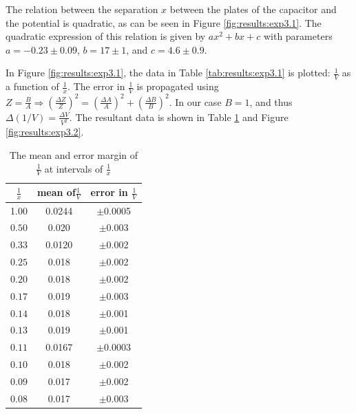 The relation between the separation $x$ between the plates of the capacitor and the potential is quadratic, as can be seen in Figure \ref{fig:results:exp3.1}. The quadratic expression of this relation is given by $ax^2+bx+c$ with parameters $a= -0.23 \pm 0.09$, $b= 17 \pm1 $, and $c=4.6 \pm 0.9$. 

In Figure \ref{fig:results:exp3.1}, the data in Table \ref{tab:results:exp3.1} is plotted: $\frac{1}{V}$ as a function of $\frac{1}{x}$. The error in $\frac{1}{V}$ is propagated using $Z = \frac{B}{A} \Rightarrow (\frac{\Delta Z}{Z})^2= (\frac{\Delta A}{A})^2 +(\frac{\Delta B}{B})^2$. In our case $B = 1$, and thus $\Delta (1/V) = \frac{\Delta V}{V^2}$. The resultant data is shown in Table \ref{tab:results:exp3.2} and Figure \ref{fig:results:exp3.2}.

\begin{table}[H]
    \begin{minipage}{\textwidth}
    \centering
        \caption{The mean and error margin of $\frac{1}{V}$ at intervals of $\frac{1}{x}$}
        \label{tab:results:exp3.2}
        \begin{tabular}{|c|c|c|} \hline 
        $\frac{1}{x}$       &  mean of$\frac{1}{V}$ & error in $\frac{1}{V}$ \\ \hline 
        1.00       & 0.0244 & $\pm$0.0005 \\ \hline 
        $0.50$      &0.020  & $\pm$0.003 \\ \hline 
        $0.33$      & 0.0120 & $\pm$0.002\\ \hline 
        $0.25$    & 0.018 &$\pm$0.002 \\ \hline 
        $0.20$    & 0.018 & $\pm$0.002 \\ \hline 
        $0.17$     & 0.019 & $\pm0.003$\\ \hline 
        $0.14$     & 0.018 & $\pm$0.001\\ \hline 
        $0.13$     & 0.019 & $\pm$0.001\\ \hline 
        $0.11$     & 0.0167& $\pm$0.0003\\ \hline 
        $0.10$     & 0.018 & $\pm$0.002\\ \hline 
        $0.09$     & 0.017 & $\pm$0.002\\ \hline 
        $0.08$     & 0.017 &$\pm$0.003 \\ \hline
        \end{tabular}
        \end{minipage}
\end{table}

